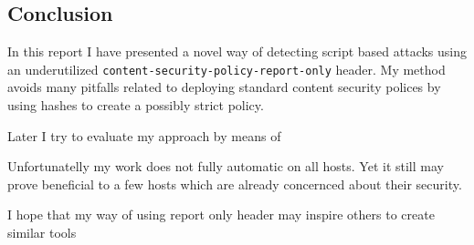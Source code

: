 \subsection{Conclusion}

In this report I have presented a novel way of detecting script based attacks using an underutilized \texttt{content-security-policy-report-only} header.
My method avoids many pitfalls related to deploying standard content security polices by using hashes to create a possibly strict policy.

Later I try to evaluate my approach by means of 

Unfortunatelly my work does not fully automatic on all hosts.
Yet it still may prove beneficial to a few hosts which are already concernced about their security.

I hope that my way of using report only header may inspire others to create similar tools
